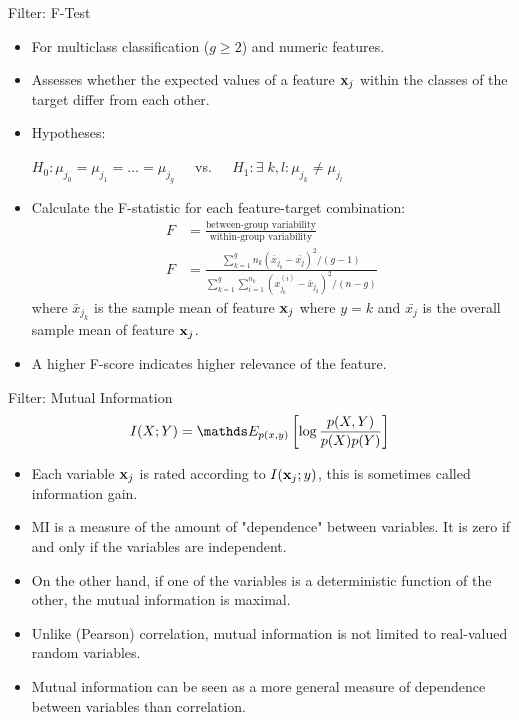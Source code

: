 \documentclass[11pt,compress,t,notes=noshow, xcolor=table]{beamer}
\begin{document}
  \begin{vbframe}{Filter: F-Test}
  \begin{itemize}
    \item For multiclass classification ($g \ge 2$) and numeric features.
    \item Assesses whether the expected values of a feature $\mathbf{x}_j$ within the classes of the target differ from each other.
    \item Hypotheses:

    $H_0: \mu_{j_0} = \mu_{j_1} = \dots = \mu_{j_g} \;\;\;\;$ vs. $\;\;\;\;H_1 : \exists \; k,l: \mu_{j_k} \neq \mu_{j_l}$
    \item Calculate the F-statistic for each feature-target combination:
    \begin{align*}
    F &= \frac{\text{between-group variability}}{\text{within-group variability}}\\
    F &= \frac{\sum_{k = 1}^g n_k (\bar{x}_{j_k} - \bar{x_j})^2/(g-1)}{\sum_{k = 1}^g \sum_{i = 1}^{n_k} (x_{j_k}^{(i)} - \bar{x}_{j_k})^2/(n-g)}
    \end{align*}
    where $\bar{x}_{j_k}$ is the sample mean of feature $\mathbf{x}_j$ where $y = k$ and $\bar{x_{j}}$ is the overall sample mean of feature $\mathbf{x}_j$.
  \item A higher F-score indicates higher relevance of the feature.
  \end{itemize}
  \end{vbframe}

  \begin{vbframe}{Filter: Mutual Information}
  $$I(X ; Y) = \E_{p(x, y)} \left[ \log \frac{p(X, Y)}{p(X) p(Y)} \right]$$

  \begin{itemize}
    \item Each variable $\mathbf{x}_j$ is rated according to $I(\mathbf{x}_j;y)$, this is sometimes called information gain.
    \item MI is a measure of the amount of "dependence" between variables. It is zero if and only if the variables are independent.
    \item On the other hand, if one of the variables is a deterministic function of the other, the mutual information is maximal.
  \item Unlike (Pearson) correlation, mutual information is not limited to real-valued random variables.
    \item Mutual information can be seen as a more general measure of dependence between variables than correlation.
  \end{itemize}
  \end{vbframe}
\end{document}
